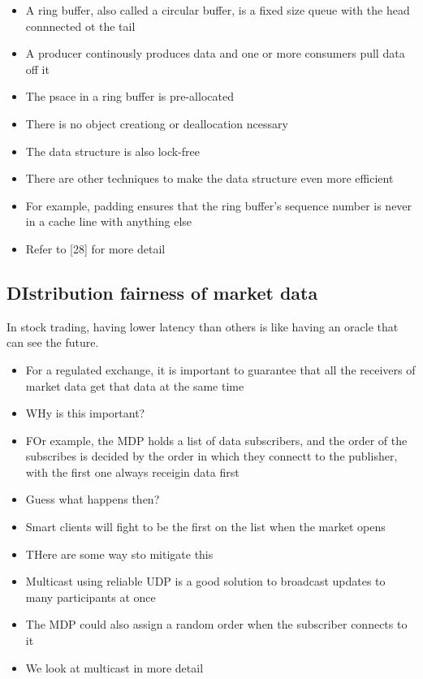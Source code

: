 \documentclass{report}
\theoremstyle{definition}
\let\oldsubsection\subsection
\renewcommand{\subsection}{\oldsubsection*}
\begin{document}
\begin{itemize}
\item
A ring buffer, also called a circular buffer, is a fixed size queue with the head connnected ot the tail
\item
A producer continously produces data and one or more consumers pull data off it
\item
The psace in a ring buffer is pre-allocated
\item
There is no object creationg or deallocation ncessary
\item
The data structure is also lock-free
\item
There are other techniques to make the data structure even more efficient
\item
For example, padding ensures that the ring buffer's sequence number is never in a cache line with anything else
\item
Refer to [28] for more detail
\end{itemize}

\subsection{DIstribution fairness of market data}

In stock trading, having lower latency than others is like having an oracle that can see the future.

\begin{itemize}
\item
For a regulated exchange, it is important to guarantee that all the receivers of market data get that data at the same time
\item
WHy is this important?
\item
FOr example, the MDP holds a list of data subscribers, and the order of the subscribes is decided by the order in which they connectt to the publisher, with the first one always receigin data first
\item
Guess what happens then?
\item
Smart clients will fight to be the first on the list when the market opens
\item
THere are some way sto mitigate this
\item
Multicast using reliable UDP is a good solution to broadcast updates to many participants at once
\item
The MDP could also assign a random order when the subscriber connects to it
\item
We look at multicast in more detail
\end{itemize}
\end{document}
